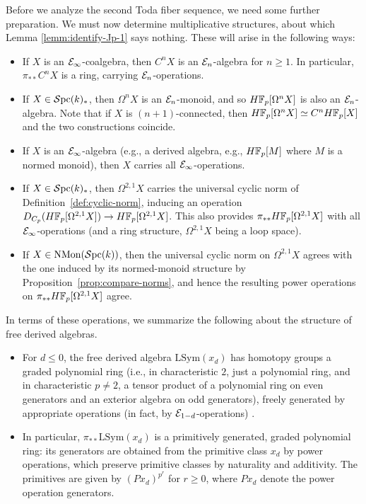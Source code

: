 \documentclass{amsart}
\numberwithin{proposition}{section}
\numberwithin{equation}{section}
\def\LSym{\mathrm{LSym}}
\def\NMon{\mathrm{NMon}}
\begin{document}
Before we analyze the second Toda fiber sequence, we need some further preparation.
We must now determine multiplicative structures, about which Lemma \ref{lemm:identify-Jp-1} says nothing.
These will arise in the following ways:
\begin{itemize}
\item If $X$ is an $\mathcal E_\infty$-coalgebra, then $C^n X$ is an $\mathcal E_n$-algebra for $n \ge 1$.
  In particular, $\pi_{**} C^n X$ is a ring, carrying $\mathcal E_n$-operations.
\item If $X \in \mathcal{S}\mathrm{pc}{}(k)_*$, then $\Omega^n X$ is an $\mathcal E_n$-monoid, and so $H\mathbb{F}_p[\Omega^n X]$ is also an $\mathcal E_n$-algebra.
  Note that if $X$ is $(n+1)$-connected, then $H\mathbb{F}_p[\Omega^n X] \simeq C^n H\mathbb{F}_p[X]$ and the two constructions coincide.
\item If $X$ is an $\mathcal E_\infty$-algebra (e.g., a derived algebra, e.g., $H\mathbb{F}_p[M]$ where $M$ is a normed monoid), then $X$ carries all $\mathcal E_\infty$-operations.
\item If $X \in \mathcal{S}\mathrm{pc}{}(k)_*$, then $\Omega^{2,1} X$ carries the universal cyclic norm of Definition~\ref{def:cyclic-norm}, inducing an operation $D_{C_p}(H\mathbb{F}_p[\Omega^{2,1}X]) \to H\mathbb{F}_p[\Omega^{2,1}X]$.
  This also provides $\pi_{**} H\mathbb{F}_p[\Omega^{2,1}X]$ with all $\mathcal E_\infty$-operations (and a ring structure, $\Omega^{2,1}X$ being a loop space).
\item If $X \in \NMon(\Spc(k))$, then the universal cyclic norm on $\Omega^{2,1}X$ agrees with the one induced by its normed-monoid structure by Proposition~\ref{prop:compare-norms}, and hence the resulting power operations on $\pi_{**} H\mathbb{F}_p[\Omega^{2,1}X]$ agree.
\end{itemize}

In terms of these operations, we summarize the following about the structure of free derived algebras.
\begin{itemize}
\item For $d \le 0$, the free derived algebra $\LSym(x_d)$ has homotopy groups a graded polynomial ring (i.e., in characteristic $2$, just a polynomial ring, and in characteristic $p\ne 2$, a tensor product of a polynomial ring on even generators and an exterior algebra on odd generators), freely generated by appropriate operations (in fact, by $\mathcal E_{1-d}$-operations) \cite[Theorem~4.1.1]{priddy1973derived}.
\item In particular, $\pi_{**}\LSym(x_d)$ is a primitively generated, graded polynomial ring: its generators are obtained from the primitive class $x_d$ by power operations, which preserve primitive classes by naturality and additivity.
  The primitives are given by $(Px_d)^{p^r}$ for $r \ge 0$, where $Px_d$ denote the power operation generators.
\end{itemize}
\end{document}
